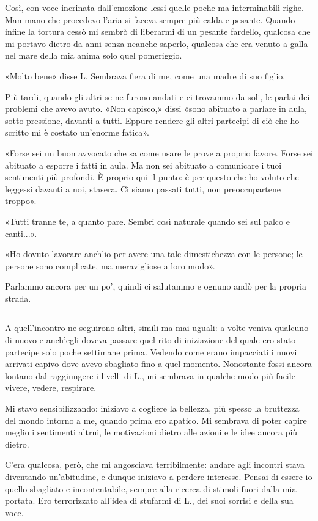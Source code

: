 \documentclass[a4paper,11pt,oneside,openright,final]{memoir}
\begin{document}
Così, con voce incrinata dall'emozione lessi quelle poche ma interminabili
righe. Man mano che procedevo l'aria si faceva sempre più calda e pesante.
Quando infine la tortura cessò mi sembrò di liberarmi di un pesante fardello,
qualcosa che mi portavo dietro da anni senza neanche saperlo, qualcosa che era
venuto a galla nel mare della mia anima solo quel pomeriggio.

«Molto bene» disse L. Sembrava fiera di me, come una madre di suo figlio.

Più tardi, quando gli altri se ne furono andati e ci trovammo da soli, le
parlai dei problemi che avevo avuto. «Non capisco,» dissi «sono abituato a
parlare in aula, sotto pressione, davanti a tutti. Eppure rendere gli altri
partecipi di ciò che ho scritto mi è costato un'enorme fatica».

«Forse sei un buon avvocato che sa come usare le prove a proprio favore. Forse
sei abituato a esporre i fatti in aula. Ma non sei abituato a comunicare i tuoi
sentimenti più profondi. È proprio qui il punto: è per questo che ho voluto che
leggessi davanti a noi, stasera. Ci siamo passati tutti, non preoccupartene
troppo».

«Tutti tranne te, a quanto pare. Sembri così naturale quando sei sul palco e
canti...».

«Ho dovuto lavorare anch'io per avere una tale dimestichezza con le persone; le
persone sono complicate, ma meravigliose a loro modo».

Parlammo ancora per un po', quindi ci salutammo e ognuno andò per la propria
strada.

\plainbreak{1}

A quell'incontro ne seguirono altri, simili ma mai uguali: a volte veniva
qualcuno di nuovo e anch'egli doveva passare quel rito di iniziazione del
quale ero stato partecipe solo poche settimane prima. Vedendo come erano
impacciati i nuovi arrivati capivo dove avevo sbagliato fino a quel momento.
Nonostante fossi ancora lontano dal raggiungere i livelli di L., mi sembrava in
qualche modo più facile vivere, vedere, respirare.

Mi stavo sensibilizzando: iniziavo a cogliere la bellezza, più spesso la
bruttezza del mondo intorno a me, quando prima ero apatico. Mi sembrava di
poter capire meglio i sentimenti altrui, le motivazioni dietro alle azioni e le
idee ancora più dietro.

C'era qualcosa, però, che mi angosciava terribilmente: andare agli incontri
stava diventando un'abitudine, e dunque iniziavo a perdere interesse. Pensai di
essere io quello sbagliato e incontentabile, sempre alla ricerca di stimoli
fuori dalla mia portata. Ero terrorizzato all'idea di stufarmi di L., dei suoi
sorrisi e della sua voce.
\end{document}
